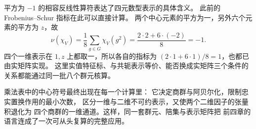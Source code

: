 平方为 $-1$ 的相容反线性算符表达了四元数型表示的具体含义。
此前的 Frobenius--Schur 指标在此可以直接计算。
两个中心元素的平方为一，另外六个元素的平方为 $z$，故
\[
\nu(\chi_V)=\frac18\sum_{g\in G}\chi_V(g^2)
=\frac{2\cdot2+6\cdot(-2)}8=-1.
\]
四个一维表示在 $1,z$ 上都取一，所以各自的指标为
$(2\cdot1+6\cdot1)/8=1$，也都已由实矩阵实现。
这里实值特征标、与共轭表示等价、能否换成实矩阵三个条件的
关系都能通过同一批八个群元核算。

乘法表中的中心符号最终出现在每一个计算里：
它决定商群与阿贝尔化，限制忠实置换作用的最小次数，
区分一维与二维不可约表示，又使两个二维因子的张量积退化为
四个商群的一维通道。这样，同一套群元、陪集与表示矩阵把
前四章的语言连成了一次可从头复算的完整应用。
